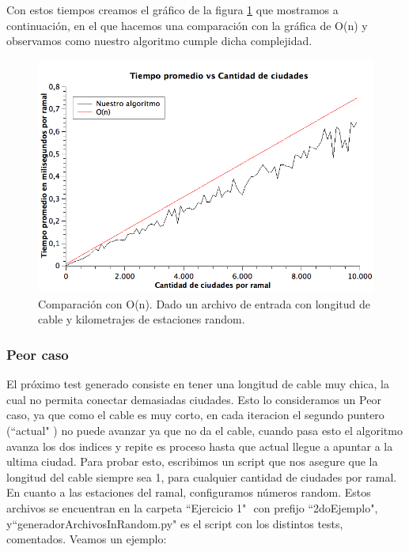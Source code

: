 Con estos tiempos creamos el gráfico de la figura \ref{ej1-tiempo-vs-cant-ciudades-random} que mostramos a continuación, en el que hacemos una comparación con la gráfica de O(n) y observamos como nuestro algoritmo cumple dicha complejidad.

\begin{figure}[H]
\begin{center}

  \includegraphics[width=\linewidth]{../graficos/ej1/TIempoPromedioVsCantidadCIudades.png}
  \caption{{\small Comparación con O(n). Dado un archivo de entrada con longitud de cable y kilometrajes de estaciones random.}} \label{ej1-tiempo-vs-cant-ciudades-random}
\endminipage

\end{center}
\end{figure}


\subsubsection{Peor caso}

El próximo test generado consiste en tener una longitud de cable muy chica, la cual no permita conectar demasiadas ciudades. Esto lo consideramos un Peor caso, ya que como el cable es muy corto, en cada iteracion el segundo puntero (``actual" $ $) no puede avanzar ya que no da el cable, cuando pasa esto el algoritmo avanza los dos indices y repite es proceso hasta que actual llegue a apuntar a la ultima ciudad.  Para probar esto, escribimos un script que nos asegure que la longitud del cable siempre sea 1, para cualquier cantidad de ciudades por ramal. En cuanto a las estaciones del ramal, configuramos números random. Estos archivos se encuentran en la carpeta ``Ejercicio 1" $ $ con prefijo ``2doEjemplo", y``generadorArchivosInRandom.py" $ $es el script con los distintos tests, comentados. Veamos un ejemplo:\\

